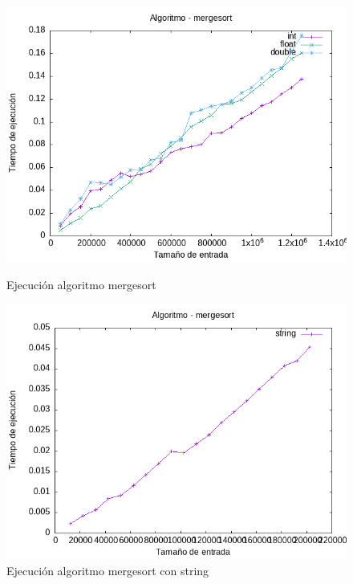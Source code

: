 \documentclass[11pt,openany]{book}
\begin{document}
    \begin{figure}[H]
        \begin{minipage}{0.5\textwidth}
            \centering
            \includegraphics[width=\linewidth]{assets/Img/mergesort.png}
            \caption{Ejecución algoritmo mergesort}
            \label{fig:mergesort}
        \end{minipage}
        \begin{minipage}{0.5\textwidth}
            \centering
            \includegraphics[width=\linewidth]{assets/Img/mergesortstring.png}
            \caption{Ejecución algoritmo mergesort con string}
            \label{fig:quicksortstring}
        \end{minipage}
    \end{figure}
\end{document}

